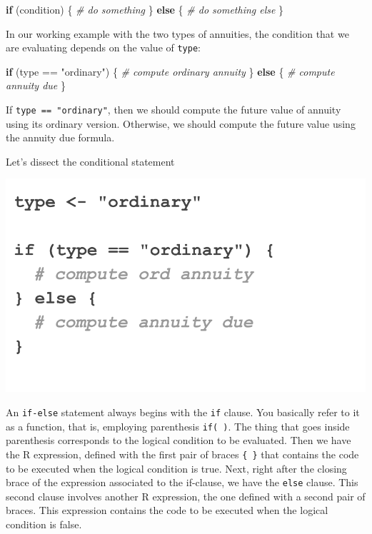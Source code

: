 \documentclass[
]{book}
\newenvironment{Shaded}{\begin{snugshade}}{\end{snugshade}}
\newcommand{\CommentTok}[1]{\textcolor[rgb]{0.56,0.35,0.01}{\textit{#1}}}
\newcommand{\ControlFlowTok}[1]{\textcolor[rgb]{0.13,0.29,0.53}{\textbf{#1}}}
\newcommand{\NormalTok}[1]{#1}
\newcommand{\SpecialCharTok}[1]{\textcolor[rgb]{0.00,0.00,0.00}{#1}}
\newcommand{\StringTok}[1]{\textcolor[rgb]{0.31,0.60,0.02}{#1}}
\begin{document}
\begin{Shaded}
\begin{Highlighting}[]
\ControlFlowTok{if}\NormalTok{ (condition) \{}
  \CommentTok{\# do something}
\NormalTok{\} }\ControlFlowTok{else}\NormalTok{ \{}
  \CommentTok{\# do something else}
\NormalTok{\}}
\end{Highlighting}
\end{Shaded}

In our working example with the two types of annuities, the condition that
we are evaluating depends on the value of \texttt{type}:

\begin{Shaded}
\begin{Highlighting}[]
\ControlFlowTok{if}\NormalTok{ (type }\SpecialCharTok{==} \StringTok{"ordinary"}\NormalTok{) \{}
  \CommentTok{\# compute ordinary annuity}
\NormalTok{\} }\ControlFlowTok{else}\NormalTok{ \{}
  \CommentTok{\# compute annuity due}
\NormalTok{\}}
\end{Highlighting}
\end{Shaded}

If \texttt{type\ ==\ "ordinary"},
then we should compute the future value of annuity using its ordinary version.
Otherwise, we should compute the future value using the annuity due formula.

Let's dissect the conditional statement

\begin{center}\includegraphics[width=0.5\linewidth]{images/conditionals/if-else-anatomy-1} \end{center}

An \texttt{if-else} statement always begins with the \texttt{if} clause. You basically refer
to it as a function, that is, employing parenthesis \texttt{if(\ )}. The thing that
goes inside parenthesis corresponds to the logical condition to be evaluated.
Then we have the R expression, defined with the first pair of braces \texttt{\{\ \}} that
contains the code to be executed when the logical condition is true. Next,
right after the closing brace of the expression associated to the if-clause, we
have the \texttt{else} clause. This second clause involves another R expression, the
one defined with a second pair of braces. This expression contains the code to
be executed when the logical condition is false.
\end{document}

